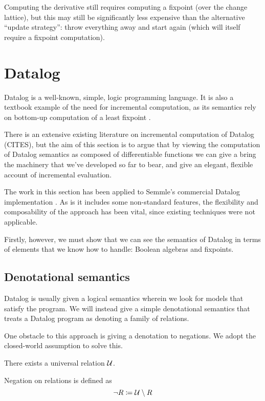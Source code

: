 Computing the derivative still requires computing a fixpoint (over the change
lattice), but this may still be significantly less expensive than the
alternative ``update strategy'': throw everything away and start
again (which will itself require a fixpoint computation).

\section{Datalog}
\label{sec:datalog}

Datalog is a well-known, simple, logic programming language. It is also a textbook
example of the need for incremental computation, as its semantics rely on
bottom-up computation of a least fixpoint \autocite[See][part D]{abiteboul1995foundations}.

There is an extensive existing literature on incremental computation of Datalog
(CITES), but the aim of this section is to argue that by viewing the computation
of Datalog semantics as composed of differentiable functions we can give a
bring the machinery that we've developed so far to bear, and give an elegant,
flexible account of incremental evaluation.

The work in this section has been applied to Semmle's commercial Datalog
implementation \autocites{semmleWebsite}{avgustinov2016ql}{sereni2008adding}{schafer2010type}.
As is it includes some non-standard features, the flexibility and composability
of the approach has been vital, since existing techniques were not applicable.

Firstly, however, we must show that we can see the semantics of Datalog in terms
of elements that we know how to handle: Boolean algebras and fixpoints.

\subsection{Denotational semantics}

Datalog is usually given a logical semantics wherein we look for models that
satisfy the program. We will instead give a simple denotational semantics that treats a Datalog
program as denoting a family of relations.

One obstacle to this approach is giving a denotation to negations. We adopt the
closed-world assumption to solve this.

\begin{defn}
  There exists a universal relation $\mathcal{U}$.
  
  Negation on relations is defined as $$\neg R \coloneqq \mathcal{U} \setminus R$$
\end{defn}

